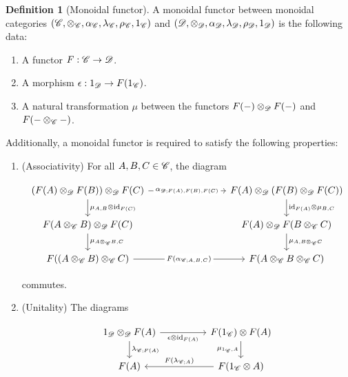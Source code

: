 \documentclass{article}
\theoremstyle{definition}
\newtheorem*{definition}{Definition}
\numberwithin{figure}{section}
\begin{document}
\begin{definition}[Monoidal functor] A monoidal functor between monoidal categories $(\mathscr{C},\otimes_{\mathscr{C}}, \alpha_{\mathscr{C}},\lambda_{\mathscr{C}},\rho_{\mathscr{C}},1_{\mathscr{C}})$ and $(\mathscr{D},\otimes_{\mathscr{D}},\alpha_{\mathscr{D}},\lambda_{\mathscr{D}},\rho_{\mathscr{D}},1_{\mathscr{D}})$ is the following data:

\begin{enumerate}
\item A functor $F: \mathscr{C}\to \mathscr{D}$.
\item A morphism $\epsilon:1_{\mathscr{D}}\to F(1_{\mathscr{C}})$.
\item A natural transformation $\mu$ between the functors $F(\--)\otimes_{\mathscr{D}}F(\--)$ and $F(\--\otimes_{\mathscr{C}}\--)$.
\end{enumerate}

Additionally, a monoidal functor is required to satisfy the following properties:

\begin{enumerate}
\item (Associativity) For all $A,B,C\in \mathscr{C}$, the diagram

\[\begin{tikzcd}
	{(F(A)\otimes_{\Dcat}F(B))\otimes_{\Dcat}F(C)} &&& {F(A)\otimes_{\Dcat}(F(B)\otimes_{\Dcat}F(C))} \\
	{F(A\otimes_{\Ccat}B)\otimes_{\Dcat}F(C)} &&& {F(A)\otimes_{\Dcat}F(B\otimes_{\Ccat}C)} \\
	{F((A\otimes_{\Ccat} B)\otimes_{\Ccat}C)} && {} & {F(A\otimes_{\Ccat}B\otimes_{\Ccat}C)}
	\arrow["{\mu_{A,B}\otimes \id_{F(C)}}", from=1-1, to=2-1]
	\arrow["{\mu_{A\otimes_{\Ccat}B,C}}", from=2-1, to=3-1]
	\arrow["{\mu_{A,B\otimes_{\Ccat}C}}", from=2-4, to=3-4]
	\arrow["{\id_{F(A)}\otimes\mu_{B,C}}", from=1-4, to=2-4]
	\arrow["{F(\alpha_{\Ccat;A,B,C})}"{description}, from=3-1, to=3-4]
	\arrow["{\alpha_{\Dcat;F(A),F(B),F(C)}}"{description}, from=1-1, to=1-4]
\end{tikzcd}\]

commutes.
\item (Unitality) The diagrams

\[\begin{tikzcd}
	{1_{\Dcat}\otimes_{\Dcat}F(A)} && {F(1_{\Ccat})\otimes F(A)} \\
	{F(A)} && {F(1_{\Ccat}\otimes A)}
	\arrow["{\lambda_{\Ccat;F(A)}}", from=1-1, to=2-1]
	\arrow["{F(\lambda_{\Ccat;A})}"', from=2-3, to=2-1]
	\arrow["{\mu_{1_{\Ccat},A}}"', from=1-3, to=2-3]
	\arrow["{\epsilon\otimes \id_{F(A)}}"', from=1-1, to=1-3]
\end{tikzcd}\]


\end{enumerate}
\end{definition}
\end{document}
